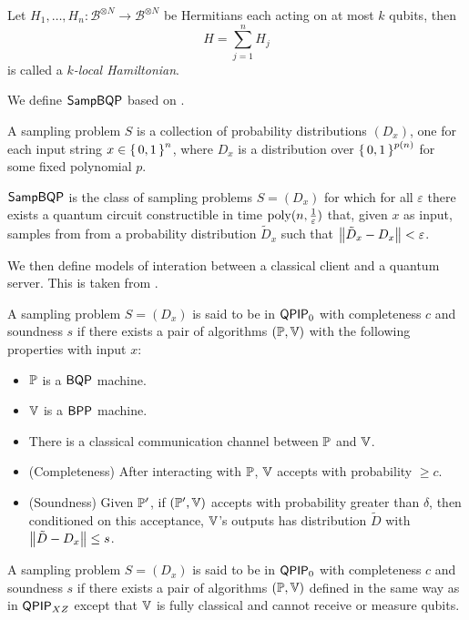 \begin{definition}
	Let $H_1, \ldots, H_n:\mathcal{B}^{\otimes N}\rightarrow\mathcal{B}^{\otimes N}$ be Hermitians each acting on at most $k$ qubits, then $$H=\sum_{j=1}^nH_j$$ is called a \emph{$k$-local Hamiltonian}.
\end{definition}

We define $\operatorname{\mathsf{SampBQP}}$ based on \cite{aaronson_2013}.

\begin{definition}
	A sampling problem $S$ is a collection of probability distributions $(D_x)$, one for each input string $x\in\set{0,1}^n$, where $D_x$ is a distribution over $\set{0,1}^{p(n)}$ for some fixed polynomial $p$.
\end{definition}

\begin{definition}
	$\operatorname{\mathsf{SampBQP}}$ is the class of sampling problems $S=(D_x)$ for which for all $\varepsilon$ there exists a quantum circuit constructible in time $\operatorname*{\operatorname{poly}}(n, \frac{1}{\varepsilon})$ that, given $x$ as input, samples from from a probability distribution $\tilde{D}_x$ such that $\left\lVert\tilde{D}_x-D_x\right\rVert<\varepsilon$.
\end{definition}

We then define models of interation between a classical client and a quantum server. This is taken from \cite{mahadev_delegation}.

\begin{definition}
	A sampling problem $S=(D_x)$ is said to be in $\operatorname{\mathsf{QPIP}}_0$ with completeness $c$ and soundness $s$ if there exists a pair of algorithms $(\mathbb{P}, \mathbb{V})$ with the following properties with input $x$:
	\begin{itemize}
		\item $\mathbb{P}$ is a $\operatorname{\mathsf{BQP}}$ machine.
		\item $\mathbb{V}$ is a $\operatorname{\mathsf{BPP}}$ machine.
		\item There is a classical communication channel between $\mathbb{P}$ and $\mathbb{V}$.
		\item (Completeness) After interacting with $\mathbb{P}$, $\mathbb{V}$ accepts with probability $\geq c$.
		\item (Soundness) Given $\mathbb{P}'$, if $(\mathbb{P}', \mathbb{V})$ accepts with probability greater than $\delta$, then conditioned on this acceptance, $\mathbb{V}$'s outputs has distribution $\tilde{D}$ with $\left\lVert\tilde{D}-D_x\right\rVert\leq s$.
	\end{itemize}
\end{definition}

\begin{definition}
	A sampling problem $S=(D_x)$ is said to be in $\operatorname{\mathsf{QPIP}}_0$ with completeness $c$ and soundness $s$ if there exists a pair of algorithms $(\mathbb{P}, \mathbb{V})$ defined in the same way as in $\operatorname{\mathsf{QPIP}}_{XZ}$ except that $\mathbb{V}$ is fully classical and cannot receive or measure qubits.
\end{definition}

